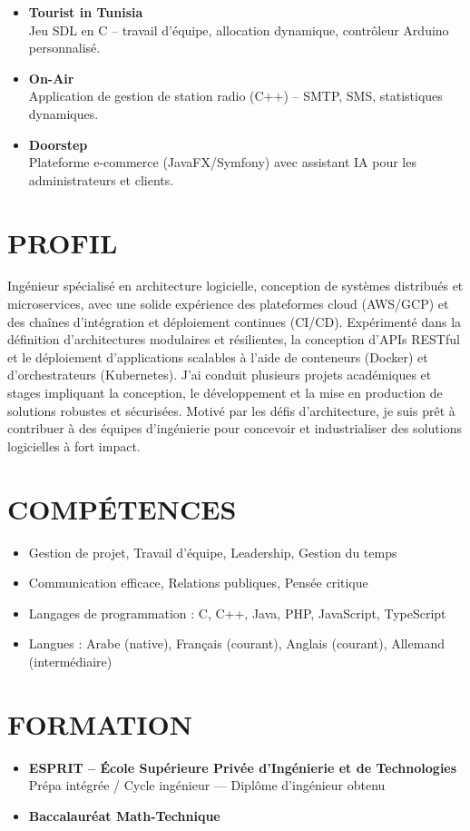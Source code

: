 \documentclass[paper=a4,fontsize=11pt]{scrartcl}
\newcommand{\sepspace}{\vspace*{0.5em}}
\newcommand{\NewPart}[1]{\section*{\uppercase{#1}}}
\begin{document}
\begin{itemize}
    \item \textbf{Tourist in Tunisia} \\
    Jeu SDL en C – travail d’équipe, allocation dynamique, contrôleur Arduino personnalisé.

    \item \textbf{On-Air} \\
    Application de gestion de station radio (C++) – SMTP, SMS, statistiques dynamiques.

    \item \textbf{Doorstep} \\
    Plateforme e-commerce (JavaFX/Symfony) avec assistant IA pour les administrateurs et clients.
\end{itemize}

\sepspace

\NewPart{Profil}
\noindent
Ingénieur spécialisé en architecture logicielle, conception de systèmes distribués et microservices, avec une solide expérience des plateformes cloud (AWS/GCP) et des chaînes d’intégration et déploiement continues (CI/CD).
Expérimenté dans la définition d'architectures modulaires et résilientes, la conception d'APIs RESTful et le déploiement d'applications scalables à l'aide de conteneurs (Docker) et d'orchestrateurs (Kubernetes).
J'ai conduit plusieurs projets académiques et stages impliquant la conception, le développement et la mise en production de solutions robustes et sécurisées. Motivé par les défis d'architecture, je suis prêt à contribuer à des équipes d'ingénierie pour concevoir et industrialiser des solutions logicielles à fort impact.

\sepspace

\NewPart{Compétences}
\begin{itemize}
    \item Gestion de projet, Travail d’équipe, Leadership, Gestion du temps
    \item Communication efficace, Relations publiques, Pensée critique
    \item Langages de programmation : C, C++, Java, PHP, JavaScript, TypeScript
    \item Langues : Arabe (native), Français (courant), Anglais (courant), Allemand (intermédiaire)
\end{itemize}

\sepspace

\NewPart{Formation}
\begin{itemize}
    \item \textbf{ESPRIT – École Supérieure Privée d’Ingénierie et de Technologies} \\
    Prépa intégrée / Cycle ingénieur --- Diplôme d'ingénieur obtenu
    \item \textbf{Baccalauréat Math-Technique}
\end{itemize}
\end{document}

